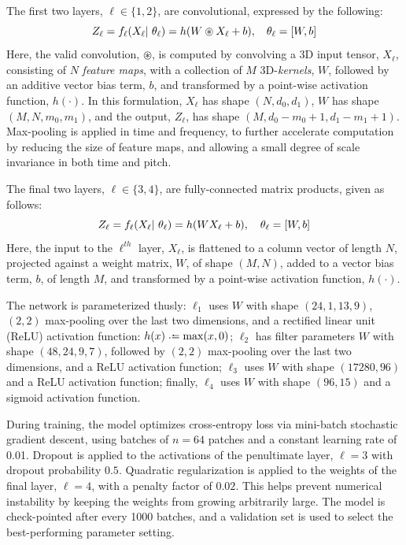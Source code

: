 \documentclass{article}
\begin{document}
The first two layers, $\ell \in \{1, 2\}$, are convolutional, expressed by the following:
\begin{equation}
\label{eq:convlayer}
\small
Z_\ell = f_\ell(X_\ell \given \theta_\ell) = h(W \circledast X_\ell + b), \quad
\theta_\ell = [W, b]
\end{equation}
Here, the valid convolution, $\circledast$, is computed by convolving a 3D input tensor,
$X_\ell$, consisting of $N$ \emph{feature maps}, with a collection of $M$ 3D-\emph{kernels}, $W$, followed by an additive vector bias term, $b$, and transformed by a point-wise activation function, $h(\cdot)$.
In this formulation, $X_\ell$ has shape $(N, d_0, d_1)$, $W$ has shape $(M, N, m_0, m_1)$,
and the output, $Z_\ell$, has shape $(M, d_0-m_0+1, d_1-m_1+1)$.
Max-pooling is applied in time and frequency, to further accelerate computation by reducing the size of feature maps, and allowing a small degree of scale invariance in both time and pitch.

The final two layers, $\ell \in \{3, 4\}$, are fully-connected matrix products, given as follows:
\begin{equation}
\label{eq:fclayer}
Z_\ell = f_\ell(X_\ell |~ \theta_\ell) = h( WX_\ell + b), \quad \theta_\ell = [W, b]
\end{equation}
Here, the input to the $\ell^{th}$ layer, $X_\ell$, is flattened to a column vector of length $N$, projected against a weight matrix, $W$, of shape $(M, N)$, added to a vector bias term, $b$, of length $M$, and transformed by a point-wise activation function, $h(\cdot)$.

The network is parameterized thusly:
$\ell_1$ uses $W$ with shape $(24, 1, 13, 9)$, $(2, 2)$ max-pooling over the last two
dimensions, and a rectified linear unit (ReLU) activation function: $h(x) \defeq \max(x, 0)$;
$\ell_2$ has filter parameters $W$ with shape $(48, 24, 9, 7)$, followed by $(2, 2)$ max-pooling over the last two dimensions, and a ReLU activation function;
$\ell_3$ uses $W$ with shape $(17280, 96)$ and a ReLU activation function;
finally, $\ell_4$ uses $W$ with shape $(96, 15)$ and a sigmoid activation function.

During training, the model optimizes cross-entropy loss via mini-batch stochastic
gradient descent, using batches of $n=64$ patches and a constant learning rate of 0.01.
Dropout is applied to the activations of the penultimate layer, $\ell=3$ with dropout
probability $0.5$.
Quadratic regularization is applied to the weights of the final layer, $\ell=4$, with a
penalty factor of $0.02$. This helps prevent numerical instability by keeping
the weights from growing arbitrarily large.
The model is check-pointed after every 1000 batches, and a validation set is used to
select the best-performing parameter setting.
\end{document}
